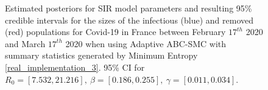 \documentclass[11pt,a4paper]{article}
\theoremstyle{break}
\begin{document}
  \begin{figure}[H]
    \centering
    \caption{Estimated posteriors for SIR model parameters and resulting 95\% credible intervals for the sizes of the infectious (blue) and removed (red) populations for Covid-19 in France between February $17^{th}$ 2020 and March $17^{th}$ 2020 when using Adaptive ABC-SMC with summary statistics generated by Minimum Entropy \ref{real_implementation_3}. 95\% CI for $R_0=[7.532,21.216],\ \beta=[0.186,0.255],\ \gamma=[0.011,0.034]$.}
    \label{fig_france_me}
  \end{figure}
\end{document}

